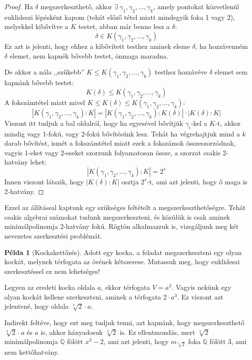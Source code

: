 \documentclass[12pt]{book}
\theoremstyle{plain} %
\theoremstyle{definition} %
\newtheorem{pl}{Példa}[section]
\theoremstyle{remark}
\numberwithin{equation}{section}  %
\begin{document}
	\begin{proof}
		Ha $\delta$ megszerkeszthető, akkor $\exists\ \gamma_1, \gamma_2, \ldots, \gamma_k$, amely pontokat közvetlenül euklideszi lépésként kapom (tehát előző tétel miatt mindegyik foka 1 vagy 2), melyekkel kibővítve a $K$ testet, abban már benne lesz a $\delta$:
		\[ \delta \in K(\gamma_1,\gamma_2,\ldots,\gamma_k)  \]
		Ez azt is jelenti, hogy ehhez a kibővített testhez aminek eleme $\delta$, ha hozzávenném $\delta$ elemet, nem kapnék bővebb testet, önmaga maradna.
		
		De akkor a nála ,,szűkebb'' $K\leq K(\gamma_1,\gamma_2,\ldots, \gamma_k)$ testhez hozzávéve $\delta$ elemet sem kapnánk bővebb testet:
		\[ K(\delta) \leq K(\gamma_1,\gamma_2,\ldots,\gamma_k)  \]
		A fokszámtétel miatt mivel $K\leq K(\delta)\leq K(\gamma_1,\gamma_2,\ldots,\gamma_k)$:
		\[ |K(\gamma_1,\gamma_2,\ldots,\gamma_k):K| = |K(\gamma_1,\gamma_2,\ldots,\gamma_k):K(\delta)| \cdot |K(\delta):K| \]
		Viszont itt tudjuk a bal oldalról, hogy ha egyesével bővítjük $\gamma_i$-kel a $K$-t, akkor mindig vagy 1-fokú, vagy 2-fokú bővítésünk lesz. Tehát ha végrehajtjuk mind a $k$ darab bővítést, ismét a fokszámtétel miatt ezek a fokszámok összeszorzódnak, vagyis 1-eket vagy 2-eseket szorzunk folyamatosan össze, a szorzat csakis 2-hatvány lehet:
		\[ |K(\gamma_1,\gamma_2,\ldots,\gamma_k):K| = 2^s  \]
		Innen viszont látszik, hogy $|K(\delta):K|$ osztja $2^s$-t, ami azt jelenti, hogy ő maga is 2-hatvány.
	\end{proof}

	Ezzel az állítással kaptunk egy szükséges feltételt a megszerkeszthetőségre. Tehát csakis algebrai számokat tudunk megszerkeszteni, és közülük is csak aminek minimálpolinomja 2-hatvány fokú. Rögtön alkalmazzuk is, vizsgáljunk meg két nevezetes szerkesztési problémát.
	
	\begin{pl}[Kockakettőzés]
		Adott egy kocka, a feladat megszerkeszteni egy olyan kockát, melynek térfogata az övének kétszerese. Mutassuk meg, hogy euklideszi szerkesztéssel ez nem lehetséges!
		
		Legyen az eredeti kocka oldala $a$, ekkor térfogata $V=a^3$. Vagyis nekünk egy olyan kockát kellene szerkeszteni, aminek a térfogata $2\cdot a^3$. Ez viszont azt jelentené, hogy oldala $\sqrt[3]{2}\cdot a$.
		
		Indirekt feltéve, hogy ezt meg tudjuk tenni, azt kapnánk, hogy megszerkeszthető $\sqrt[3]{2}\cdot a$ és $a$ is, akkor hányadosuk $\sqrt[3]{2}$ is. Ez ellentmondás, mert $\sqrt[3]{2}$ minimálpolinomja $\mathbb{Q}$ fölött $x^3-2$, ami azt jelenti, hogy $m_{\sqrt[3]{2}}$ foka $\mathbb{Q}$ fölött $3$, ami nem kettőhatvány.
	\end{pl}
\end{document}
